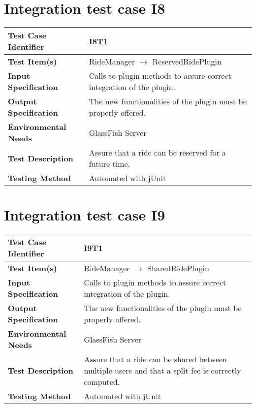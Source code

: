 \vspace{2em}

\section{Integration test case I8}

\begin{tabular}{l p{}}
    \hline
    \textbf{Test Case Identifier} & I8T1\\
    \hline
    \textbf{Test Item(s)} & RideManager $\rightarrow$ ReservedRidePlugin\\
    \hline
    \textbf{Input Specification} & Calls to plugin methods to assure correct integration of the plugin.\\
    \hline
    \textbf{Output Specification} & The new functionalities of the plugin must be properly offered.\\
    \hline
    \textbf{Environmental Needs} & GlassFish Server\\
    \hline
    \textbf{Test Description} & Assure that a ride can be reserved for a future time.\\
    \hline
    \textbf{Testing Method} & Automated with jUnit \\
    \hline
\end{tabular}

\vspace{2em}

\section{Integration test case I9}

\begin{tabular}{l p{}}
    \hline
    \textbf{Test Case Identifier} & I9T1\\
    \hline
    \textbf{Test Item(s)} & RideManager $\rightarrow$ SharedRidePlugin\\
    \hline
    \textbf{Input Specification} & Calls to plugin methods to assure correct integration of the plugin.\\
    \hline
    \textbf{Output Specification} & The new functionalities of the plugin must be properly offered.\\
    \hline
    \textbf{Environmental Needs} & GlassFish Server\\
    \hline
    \textbf{Test Description} & Assure that a ride can be shared between multiple users and that a split fee is correctly computed.\\
    \hline
    \textbf{Testing Method} & Automated with jUnit \\
    \hline
\end{tabular}

